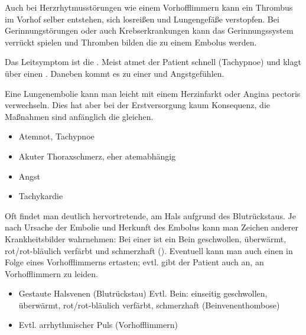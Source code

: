Auch bei Herzrhytmusstörungen wie einem
Vorhofflimmern kann ein Thrombus im Vorhof selber entstehen,
sich losreißen und Lungengefäße verstopfen. Bei
Gerinnungstörungen oder auch Krebserkrankungen kann das
Gerinnungssystem verrückt spielen und Thromben bilden die zu
einem Embolus werden.

{%
Das Leitsymptom ist die . 
Meist atmet der Patient schnell (Tachypnoe) und klagt über
einen . Daneben kommt es zu
einer  und Angstgefühlen.

Eine Lungenembolie kann man leicht mit einem Herzinfarkt
oder Angina pectoris verwechseln. Dies hat aber bei der
Erstversorgung kaum Konsequenz, die Maßnahmen sind
anfänglich die gleichen.

}{
\begin{itemize}
  \item Atemnot, Tachypnoe
  \item Akuter Thoraxschmerz, eher atemabhängig
  \item Angst
  \item Tachykardie
\end{itemize}
}{}{}{}


{%
Oft findet man deutlich hervortretende, 
am Hals aufgrund des Blutrückstaus.
Je nach Ursache der Embolie und Herkunft des Embolus kann
man Zeichen anderer Krankheitsbilder wahrnehmen: Bei einer
 ist ein Bein geschwollen,
überwärmt, rot/rot-bläulich verfärbt und schmerzhaft
(). Eventuell kann man auch einen
 in Folge eines Vorhofflimmerns
ertasten; evtl. gibt der Patient auch an, an Vorhofflimmern
zu leiden.
}{
\begin{itemize}
  \item Gestaute Halsvenen (Blutrückstau) 
  Evtl. Bein: einseitig geschwollen,
  überwärmt, rot/rot-bläulich verfärbt, schmerzhaft (Beinvenenthombose)
  \item Evtl. arrhythmischer Puls (Vorhofflimmern)
\end{itemize}
}{}{}{}


